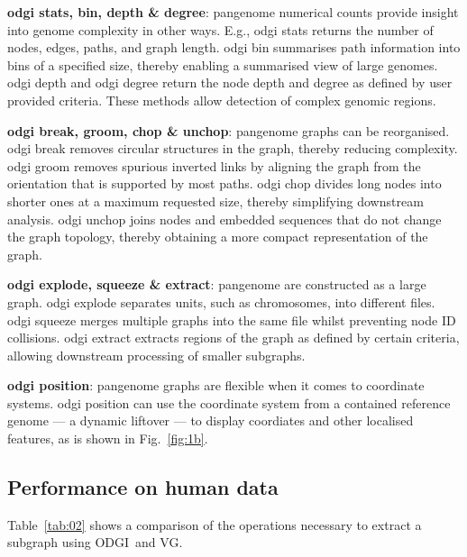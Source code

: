 \documentclass{bioinfo}
\newcommand{\odgi}{ODGI}
\newcommand{\cmd}[1]{{\scriptsize\textrm{#1}}}
\newcommand{\cmdbf}[1]{{\textbf{#1}}}
\newcommand{\topic}[1]{{\cmdbf{#1}}:}
\begin{document}
    \topic{odgi stats, bin, depth \& degree} pangenome numerical
    counts provide insight into genome complexity in other
    ways. E.g., \cmd{odgi stats} returns the number of nodes,
    edges, paths, and graph length. \cmd{odgi bin} summarises path
    information into bins of a specified size, thereby enabling a
    summarised view of large genomes. \cmd{odgi depth} and
    \cmd{odgi degree} return the node depth and degree as defined by
    user provided criteria. These methods allow detection of complex
    genomic regions.

    \topic{odgi break, groom, chop \& unchop} pangenome graphs can be
    reorganised.  \cmd{odgi break} removes circular structures in the
    graph, thereby reducing complexity. \cmd{odgi groom} removes
    spurious inverted links by aligning the graph from the orientation
    that is supported by most paths. \cmd{odgi chop} divides long
    nodes into shorter ones at a maximum requested size, thereby
    simplifying downstream analysis.  \cmd{odgi unchop} joins nodes
    and embedded sequences that do not change the graph topology,
    thereby obtaining a more compact representation of the graph.

    \topic{odgi explode, squeeze \& extract} pangenome are constructed
    as a large graph. \cmd{odgi explode} separates units, such as
    chromosomes, into different files.  \cmd{odgi squeeze} merges
    multiple graphs into the same file whilst preventing node ID
    collisions. \cmd{odgi extract} extracts regions of the graph as
    defined by certain criteria, allowing downstream processing of
    smaller subgraphs.

    \topic{odgi position} pangenome graphs are flexible when it comes
    to coordinate systems. \cmd{odgi position} can use the coordinate
    system from a contained reference genome --- a dynamic liftover
    --- to display coordiates and other localised features, as is shown in
    Fig.~\ref{fig:1b}.

    \subsection{Performance on human data}

    Table~\ref{tab:02} shows a comparison of the operations necessary to extract a subgraph using \odgi\ and VG.
\end{document}
